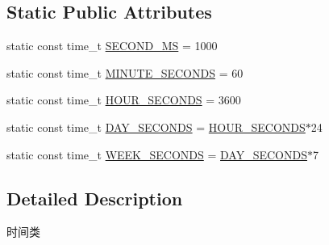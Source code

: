 \subsection*{Static Public Attributes}
\begin{DoxyCompactItemize}
\item 
static const time\-\_\-t \hyperlink{classec_1_1Time_a7b380e6d270256754d650e7ab7a70237}{S\-E\-C\-O\-N\-D\-\_\-\-M\-S} = 1000
\item 
static const time\-\_\-t \hyperlink{classec_1_1Time_a62df9dad0fe2b844c4402643bf41e99f}{M\-I\-N\-U\-T\-E\-\_\-\-S\-E\-C\-O\-N\-D\-S} = 60
\item 
static const time\-\_\-t \hyperlink{classec_1_1Time_a7235624a504da44bc4e361bc44184324}{H\-O\-U\-R\-\_\-\-S\-E\-C\-O\-N\-D\-S} = 3600
\item 
static const time\-\_\-t \hyperlink{classec_1_1Time_aea1823b361d59f11f6a0a39b9cd4faea}{D\-A\-Y\-\_\-\-S\-E\-C\-O\-N\-D\-S} = \hyperlink{classec_1_1Time_a7235624a504da44bc4e361bc44184324}{H\-O\-U\-R\-\_\-\-S\-E\-C\-O\-N\-D\-S}$\ast$24
\item 
static const time\-\_\-t \hyperlink{classec_1_1Time_a785218cc22a7610f035cb6b36c84e62c}{W\-E\-E\-K\-\_\-\-S\-E\-C\-O\-N\-D\-S} = \hyperlink{classec_1_1Time_aea1823b361d59f11f6a0a39b9cd4faea}{D\-A\-Y\-\_\-\-S\-E\-C\-O\-N\-D\-S}$\ast$7
\end{DoxyCompactItemize}


\subsection{Detailed Description}
时间类 

